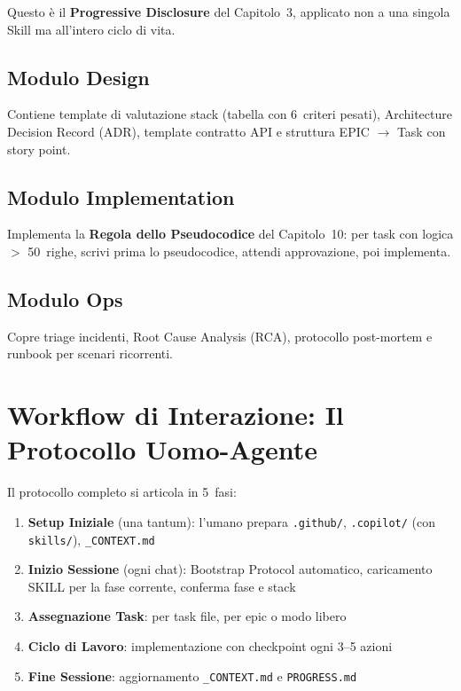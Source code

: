 Questo è il \textbf{Progressive Disclosure} del Capitolo~3, applicato non a una singola Skill ma all'intero ciclo di vita.

\subsection{Modulo Design}

Contiene template di valutazione stack (tabella con 6~criteri pesati), Architecture Decision Record (ADR), template contratto API e struttura EPIC $\rightarrow$ Task con story point.

\subsection{Modulo Implementation}

Implementa la \textbf{Regola dello Pseudocodice} del Capitolo~10: per task con logica $>$ 50~righe, scrivi prima lo pseudocodice, attendi approvazione, poi implementa.

\subsection{Modulo Ops}

Copre triage incidenti, Root Cause Analysis (RCA), protocollo post-mortem e runbook per scenari ricorrenti.

\section{Workflow di Interazione: Il Protocollo Uomo-Agente}

Il protocollo completo si articola in 5~fasi:

\begin{enumerate}
  \item \textbf{Setup Iniziale} (una tantum): l'umano prepara \texttt{.github/}, \texttt{.copilot/} (con \texttt{skills/}), \texttt{\_CONTEXT.md}
  \item \textbf{Inizio Sessione} (ogni chat): Bootstrap Protocol automatico, caricamento SKILL per la fase corrente, conferma fase e stack
  \item \textbf{Assegnazione Task}: per task file, per epic o modo libero
  \item \textbf{Ciclo di Lavoro}: implementazione con checkpoint ogni 3--5 azioni
  \item \textbf{Fine Sessione}: aggiornamento \texttt{\_CONTEXT.md} e \texttt{PROGRESS.md}
\end{enumerate}

